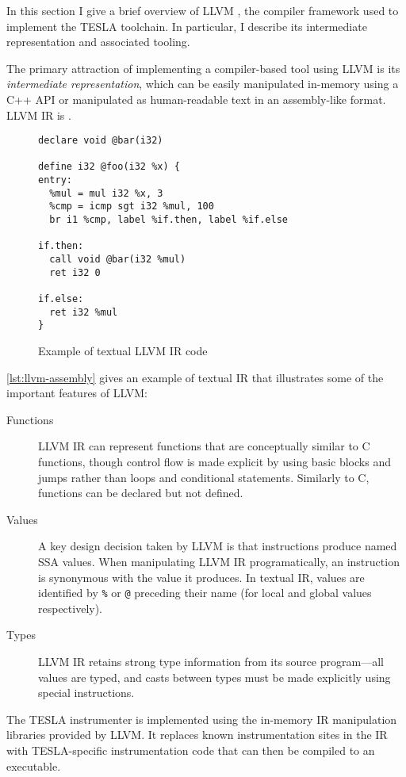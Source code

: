In this section I give a brief overview of LLVM \cite{lattner_llvm:_2002}, the
compiler framework used to implement the TESLA toolchain. In particular, I
describe its intermediate representation and associated tooling.

The primary attraction of implementing a compiler-based tool using LLVM is its
\emph{intermediate representation}, which can be easily manipulated in-memory
using a C++ API or manipulated as human-readable text in an assembly-like
format. LLVM IR is .

\begin{figure}
  \begin{verbatim}
declare void @bar(i32)

define i32 @foo(i32 %x) {
entry:
  %mul = mul i32 %x, 3
  %cmp = icmp sgt i32 %mul, 100
  br i1 %cmp, label %if.then, label %if.else

if.then:
  call void @bar(i32 %mul)
  ret i32 0

if.else:
  ret i32 %mul
}
  \end{verbatim}
  \caption{Example of textual LLVM IR code}
  \label{lst:llvm-assembly}
\end{figure}

\autoref{lst:llvm-assembly} gives an example of textual IR that illustrates some
of the important features of LLVM:
\begin{description}
  \item[Functions] LLVM IR can represent functions that are conceptually similar
    to C functions, though control flow is made explicit by using basic blocks
    and jumps rather than loops and conditional statements. Similarly to C,
    functions can be declared but not defined.

  \item[Values] A key design decision taken by LLVM is that instructions produce
    named SSA values. When manipulating LLVM IR programatically, an instruction
    is synonymous with the value it produces. In textual IR, values are
    identified by \texttt{\%} or \texttt{@} preceding their name (for local and
    global values respectively).

  \item[Types] LLVM IR retains strong type information from its source
    program---all values are typed, and casts between types must be made
    explicitly using special instructions.
\end{description}

The TESLA instrumenter is implemented using the in-memory IR manipulation
libraries provided by LLVM. It replaces known instrumentation sites in the IR
with TESLA-specific instrumentation code that can then be compiled to an
executable.
